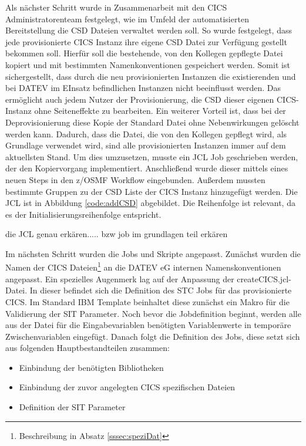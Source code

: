 Als nächster Schritt wurde in Zusammenarbeit mit den CICS Administratorenteam festgelegt, wie im Umfeld der automatisierten Bereitstellung die CSD Dateien verwaltet werden soll.
So wurde festgelegt, dass jede provisionierte CICS Instanz ihre eigene CSD Datei zur Verfügung gestellt bekommen soll.
Hierfür soll die bestehende, von den Kollegen gepflegte Datei kopiert und mit bestimmten Namenkonventionen gespeichert werden.
Somit ist sichergestellt, dass durch die neu provisionierten Instanzen die existierenden und bei DATEV im EInsatz befindlichen Instanzen  nicht beeinflusst werden.
Das ermöglicht auch jedem Nutzer der Provisionierung, die CSD dieser eigenen CICS-Instanz ohne Seiteneffekte zu bearbeiten.
Ein weiterer Vorteil ist, dass bei der Deprovisionierung diese Kopie der Standard Datei ohne Nebenwirkungen gelöscht werden kann.
Dadurch, dass die Datei, die von den Kollegen gepflegt wird, als Grundlage verwendet wird, sind alle provisionierten Instanzen immer auf dem aktuellsten Stand.
Um dies umzusetzen, musste ein JCL Job geschrieben werden, der den Kopiervorgang implementiert.
Anschließend wurde dieser mittels eines neuen Steps in den z/OSMF Workflow eingebunden.
Außerdem mussten bestimmte Gruppen zu der CSD Liste der CICS Instanz hinzugefügt werden.
Die JCL ist in Abbildung \ref{code:addCSD} abgebildet.
Die Reihenfolge ist relevant, da es der Initialisierungsreihenfolge entspricht.

die JCL genau erkären..... bzw job im grundlagen teil erkären

Im nächsten Schritt wurden die Jobs und Skripte angepasst.
Zunächst wurden die Namen der CICS Dateien\footnote{Beschreibung in Absatz \ref{sssec:speziDat}} an die DATEV eG internen Namenskonventionen angepasst.
Ein spezielles Augenmerk lag auf der Anpassung der \glqq createCICS.jcl\grqq-Datei.
In dieser befindet sich die Definition des STC Jobs für das provisionierte CICS.
Im Standard IBM Template beinhaltet diese zunächst ein Makro für die Validierung der SIT Parameter.
Noch bevor die Jobdefinition beginnt, werden alle aus der Datei für die Eingabevariablen benötigten Variablenwerte in temporäre Zwischenvariablen eingefügt.
Danach folgt die Definition des Jobs, diese setzt sich aus folgenden Hauptbestandteilen zusammen:

\begin{samepage}
\begin{itemize}
\item Einbindung der benötigten Bibliotheken
\item Einbindung der zuvor angelegten CICS spezifischen Dateien
\item Definition der SIT Parameter
\end{itemize}
\end{samepage}

